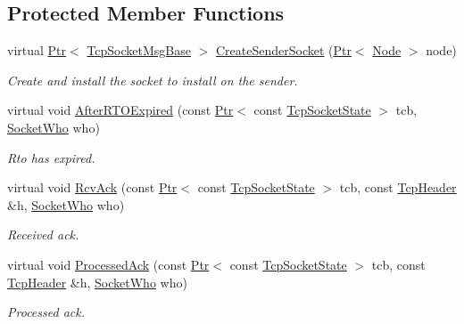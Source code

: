 \subsection*{Protected Member Functions}
\begin{DoxyCompactItemize}
\item 
virtual \hyperlink{classns3_1_1Ptr}{Ptr}$<$ \hyperlink{classns3_1_1TcpSocketMsgBase}{Tcp\+Socket\+Msg\+Base} $>$ \hyperlink{classTcpRtoTest_ab2403191ee2bca4b03bd7d9f1fd5c832}{Create\+Sender\+Socket} (\hyperlink{classns3_1_1Ptr}{Ptr}$<$ \hyperlink{classns3_1_1Node}{Node} $>$ node)
\begin{DoxyCompactList}\small\item\em Create and install the socket to install on the sender. \end{DoxyCompactList}\item 
virtual void \hyperlink{classTcpRtoTest_a8e8c0a4c42dc7c023bc01c7238158a2b}{After\+R\+T\+O\+Expired} (const \hyperlink{classns3_1_1Ptr}{Ptr}$<$ const \hyperlink{classns3_1_1TcpSocketState}{Tcp\+Socket\+State} $>$ tcb, \hyperlink{classns3_1_1TcpGeneralTest_a29338e6b7137cad650c2ff835713f6ee}{Socket\+Who} who)
\begin{DoxyCompactList}\small\item\em Rto has expired. \end{DoxyCompactList}\item 
virtual void \hyperlink{classTcpRtoTest_a9ce3525fe6eef86d0744eb1cfe9c1a4d}{Rcv\+Ack} (const \hyperlink{classns3_1_1Ptr}{Ptr}$<$ const \hyperlink{classns3_1_1TcpSocketState}{Tcp\+Socket\+State} $>$ tcb, const \hyperlink{classns3_1_1TcpHeader}{Tcp\+Header} \&h, \hyperlink{classns3_1_1TcpGeneralTest_a29338e6b7137cad650c2ff835713f6ee}{Socket\+Who} who)
\begin{DoxyCompactList}\small\item\em Received ack. \end{DoxyCompactList}\item 
virtual void \hyperlink{classTcpRtoTest_afd084dc540658016007b73c94f00e927}{Processed\+Ack} (const \hyperlink{classns3_1_1Ptr}{Ptr}$<$ const \hyperlink{classns3_1_1TcpSocketState}{Tcp\+Socket\+State} $>$ tcb, const \hyperlink{classns3_1_1TcpHeader}{Tcp\+Header} \&h, \hyperlink{classns3_1_1TcpGeneralTest_a29338e6b7137cad650c2ff835713f6ee}{Socket\+Who} who)
\begin{DoxyCompactList}\small\item\em Processed ack. \end{DoxyCompactList}\item 

\end{DoxyCompactItemize}
